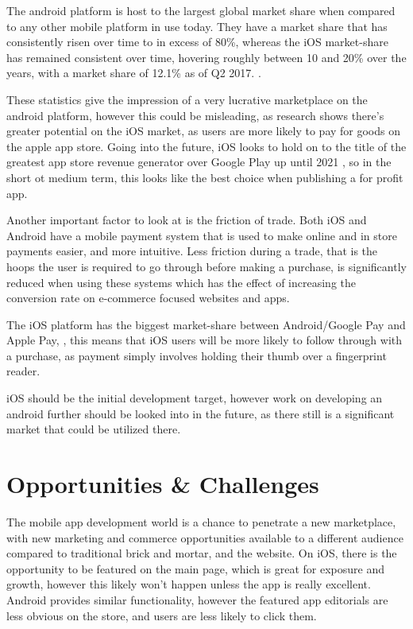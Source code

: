 \documentclass{scrreprt}
\begin{document}
The android platform is host to the largest global market share when compared to any other mobile platform in use today. They have a market share that has consistently risen over time to in excess of 80\%, whereas the iOS market-share has remained consistent over time, hovering roughly between 10 and 20\% over the years, with a market share of 12.1\% as of Q2 2017. \cite{2017MobileStatista}.

These statistics give the impression of a very lucrative marketplace on the android platform, however this could be misleading, as research shows there's greater potential on the iOS market, as users are more likely to pay for goods on the apple app store. Going into the future, iOS looks to hold on to the title of the greatest app store revenue generator over Google Play up until 2021 \cite{2017App2021}, so in the short ot medium term, this looks like the best choice when publishing a for profit app.

Another important factor to look at is the friction of trade. Both iOS and Android have a mobile payment system that is used to make online and in store payments easier, and more intuitive. Less friction during a trade, that is the hoops the user is required to go through before making a purchase, is significantly reduced when using these systems which has the effect of increasing the conversion rate on e-commerce focused websites and apps.

The iOS platform has the biggest market-share between Android/Google Pay and Apple Pay, \cite{2017UserStatistic}, this means that iOS users will be more likely to follow through with a purchase, as payment simply involves holding their thumb over a fingerprint reader.

iOS should be the initial development target, however work on developing an android further should be looked into in the future, as there still is a significant market that could be utilized there.

\section{Opportunities \& Challenges}

The mobile app development world is a chance to penetrate a new marketplace, with new marketing and commerce opportunities available to a different audience compared to traditional brick and mortar, and the website. On iOS, there is the opportunity to be featured on the main page, which is great for exposure and growth, however this likely won't happen unless the app is really excellent. Android provides similar functionality, however the featured app editorials are less obvious on the store, and users are less likely to click them.
\end{document}
